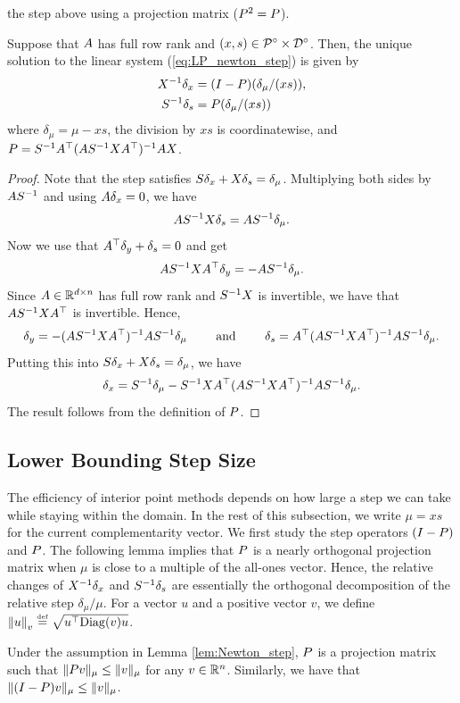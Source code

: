 the step above using a projection matrix ($P^{2}=P$).
\begin{lem}
\label{lem:Newton_step}Suppose that $A$ has full row rank and
$(x,s)\in\mathcal{P}^{\circ}\times\mathcal{D}^{\circ}$. Then, the unique solution
to the linear system (\ref{eq:LP_newton_step}) is given by
\begin{align*}
X^{-1}\delta_{x} & =(I-P)(\delta_{\mu}/(xs)),\\
S^{-1}\delta_{s} & =P(\delta_{\mu}/(xs))
\end{align*}
where $\delta_{\mu}=\mu-xs$, the division by $xs$ is coordinatewise,
and $P=S^{-1}A^{\top}(AS^{-1}XA^{\top})^{-1}AX$.
\end{lem}

\begin{proof}
Note that the step satisfies $S\delta_{x}+X\delta_{s}=\delta_{\mu}$.
Multiplying both sides by $AS^{-1}$ and using $A\delta_{x}=0$,
we have
\[
AS^{-1}X\delta_{s}=AS^{-1}\delta_{\mu}.
\]
Now we use that $A^{\top}\delta_{y}+\delta_{s}=0$ and get
\[
AS^{-1}XA^{\top}\delta_{y}=-AS^{-1}\delta_{\mu}.
\]
Since $A\in\mathbb{R}^{d\times n}$ has full row rank and $S^{-1}X$
is invertible, we have that $AS^{-1}XA^{\top}$ is invertible.
Hence, 
\[
\delta_{y}=-(AS^{-1}XA^{\top})^{-1}AS^{-1}\delta_{\mu}\mbox{\ensuremath{\qquad} and \ensuremath{\qquad}}\delta_{s}=A^{\top}(AS^{-1}XA^{\top})^{-1}AS^{-1}\delta_{\mu}.
\]
Putting this into $S\delta_{x}+X\delta_{s}=\delta_{\mu}$, we
have
\[
\delta_{x}=S^{-1}\delta_{\mu}-S^{-1}XA^{\top}(AS^{-1}XA^{\top})^{-1}AS^{-1}\delta_{\mu}.
\]
The result follows from the definition of $P$.
\end{proof}

\subsection{Lower Bounding Step Size}

The efficiency of interior point methods depends on how large a step
we can take while staying within the domain. In the rest of this subsection,
we write $\mu=xs$ for the current complementarity vector. We first
study the step operators $(I-P)$ and $P$. The following
lemma implies that $P$ is a nearly orthogonal projection matrix
when $\mu$ is close to a multiple of the all-ones vector. Hence,
the relative changes of $X^{-1}\delta_{x}$ and $S^{-1}\delta_{s}$
are essentially the orthogonal decomposition of the relative step
$\delta_{\mu}/\mu$. For a vector $u$ and a positive vector $v$,
we define $\left\Vert u\right\Vert_{v}\stackrel{\mathrm{{\scriptscriptstyle def}}}{=}\sqrt{u^{\top}\mathrm{Diag}(v)u}$.
\begin{lem}
\label{lem:Projection_property}Under the assumption in Lemma \ref{lem:Newton_step},
$P$ is a projection matrix such that $\|P v\|_{\mu}\leq\|v\|_{\mu}$
for any $v\in\mathbb{R}^{n}$. Similarly, we have that $\|(I-P)v\|_{\mu}\leq\|v\|_{\mu}$.
\end{lem}

